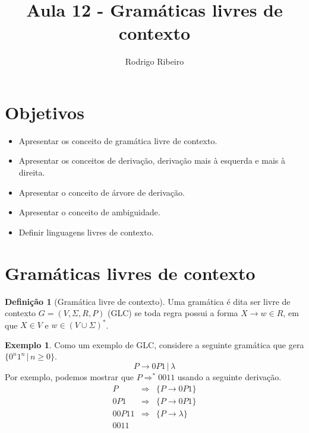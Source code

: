 \documentclass[a4paper]{article}
\theoremstyle{definition}
\newtheorem{Example}{Exemplo}
\newtheorem{Definition}{Definição}
\begin{document}
  \title{Aula 12 - Gramáticas livres de contexto}
  \author{Rodrigo Ribeiro}

  \maketitle


  \pagestyle{fancy}


  \section*{Objetivos}

  \begin{itemize}
     \item Apresentar os conceito de gramática livre de contexto.
     \item Apresentar os conceitos de derivação, derivação mais à esquerda e
       mais à direita.
     \item Apresentar o conceito de árvore de derivação.
     \item Apresentar o conceito de ambiguidade.
     \item Definir linguagens livres de contexto.
  \end{itemize}


  \section{Gramáticas livres de contexto}

  \begin{Definition}[Gramática livre de contexto]
    Uma gramática é dita ser livre de contexto $G=(V,\Sigma,R,P)$ (GLC) se
    toda regra possui a forma $X \to w \in R$, em que $X \in V$ e $w \in (V \cup
    \Sigma)^*$.
  \end{Definition}
 
  \begin{Example}
    Como um exemplo de GLC, considere a seguinte gramática que gera
    $\{0^n1^n\,|\,n\geq 0\}$.
    \[
      P \to 0P1\,|\,\lambda
    \]
    Por exemplo, podemos mostrar que $P\Rightarrow^*0011$ usando a seguinte
    derivação.
    \[
      \begin{array}{lcl}
        P & \Rightarrow & \{P \to 0P1\}\\
        0P1 & \Rightarrow & \{P \to 0P1\}\\
        00P11 & \Rightarrow & \{P \to \lambda\}\\
        0011
       \end{array}
    \]
  \end{Example}
\end{document}
